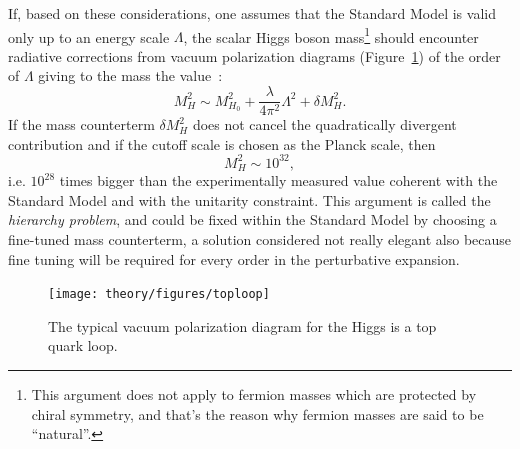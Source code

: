 If, based on these considerations,  one assumes that 
the Standard Model is valid only up to  an energy scale 
$\Lambda$, the scalar Higgs boson mass\footnote{This 
argument does not apply to fermion masses which are 
protected by chiral symmetry, and that's the reason 
why fermion masses are said to be ``natural''.} 
should encounter radiative corrections from 
vacuum polarization diagrams (Figure~\ref{topLoop}) 
of the order of $\Lambda$ giving to the mass the 
value~\cite{dawson-1997}:
\begin{equation}\label{eq:higgsMass}
M_{H}^{2} \sim M_{H_{0}}^{2} 
+ \dfrac{\lambda}{4\pi^{2}} \Lambda^{2} 
+ \delta M_{H}^{2}. \end{equation}
If the mass counterterm $\delta M_{H}^{2}$ does not 
cancel the quadratically divergent contribution and 
if the cutoff scale is chosen as the Planck scale, then
\begin{equation}
M_{H}^{2} \sim 10^{32},\end{equation} 
i.e. $10^{28}$ times bigger than the experimentally 
measured value coherent with the Standard Model 
and with the unitarity constraint. This argument 
is called the \textit{hierarchy problem}, and 
could be fixed within the Standard Model by 
choosing a fine-tuned mass counterterm, a 
solution considered not really elegant also 
because fine tuning will be required for every 
order in the perturbative expansion.
\begin{figure}[htb]\begin{center}
\texttt{[image: theory/figures/toploop]}
\caption{The typical vacuum polarization diagram for the Higgs is a top quark loop.}
\label{topLoop}\end{center}\end{figure}



